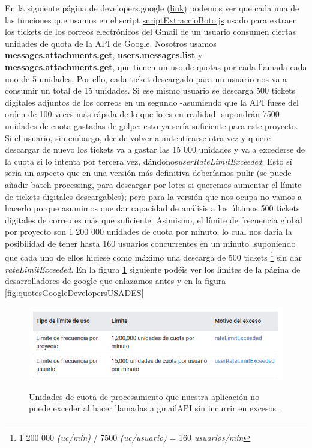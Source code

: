 \documentclass[a4paper,12pt]{report}
\begin{document}
	En la siguiente página de  developers.google \cite{gmail_api_quota} (\href{https://developers.google.com/workspace/gmail/api/reference/quota?hl=es-419}{link}) podemos ver que cada una de las funciones que usamos en el script \href{https://github.com/blackcub3s/mercAppAuxPas4/blob/main/js/scriptExtraccioBoto.js}{scriptExtraccioBoto.js} usado para extraer los tickets de los correos electrónicos del Gmail de un usuario consumen ciertas unidades de quota de la API de Google. Nosotros usamos \textbf{messages.attachments.get}, \textbf{users.messages.list} y \textbf{messages.attachments.get}, que tienen un uso de quotas por cada llamada cada uno de 5 unidades. Por ello, cada ticket descargado para un usuario nos va a consumir un total de 15 unidades. Si ese mismo usuario se descarga 500 tickets digitales adjuntos de los correos en un segundo -asumiendo que la API fuese del orden de 100 veces más rápida de lo que lo es en realidad- supondrán 7500 unidades de cuota gastadas de golpe: esto ya sería suficiente para este proyecto. Si el usuario, sin embargo, decide volver a autenticarse  otra vez y quiere descargar de nuevo los tickets va a gastar las 15 000 unidades y va a excederse de la cuota si lo intenta por tercera vez, dándonos\textit{userRateLimitExceeded}: Esto sí sería un aspecto que en una versión más definitiva deberíamos pulir (se puede añadir batch processing, para descargar por lotes si queremos aumentar el límite de tickets digitales descargables); pero para la versión que nos ocupa no vamos a hacerlo porque asumimos que dar capacidad de análisis a los últimos 500  tickets digitales de correo es más que suficiente. Asimismo, el límite de frecuencia global por proyecto son 1 200 000 unidades de cuota por minuto, lo cual nos daría la posibilidad de tener hasta 160 usuarios concurrentes en un minuto ,suponiendo que cada uno de ellos hiciese como máximo una descarga de 500  tickets \footnote{1 200 000 \textit{(uc/min)} / 7500 \textit{(uc/usuario)} = 160 \textit{\textit{usuarios/min}}} sin dar \textit{rateLimitExceeded}. En la figura \ref{fig:quotesGoogleDevelopers} siguiente podéis ver los límites de la página de desarrolladores de google que enlazamos antes y en la figura \ref{fig:quotesGoogleDevelopersUSADES}
	
	
	\FloatBarrier
	\setlength{\belowcaptionskip}{3pt}
	\begin{figure}[H]
		\centering
		\caption{Unidades de cuota de procesamiento que nuestra aplicación no puede exceder al hacer llamadas a gmailAPI sin incurrir en excesos \cite{gmail_api_quota}.}
		\includegraphics[width=1\linewidth]{img/quotesGoogleDevelopers.png}
		\label{fig:quotesGoogleDevelopers}
	\end{figure}
	\FloatBarrier
	
\end{document}
